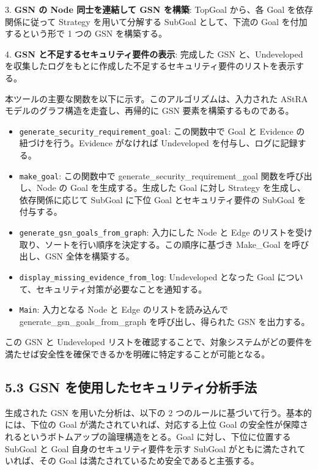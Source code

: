 \documentclass[paper]{ieicej} %
\begin{document}
3. \textbf{GSN の Node 同士を連結して GSN を構築}: TopGoal から、各 Goal を依存関係に従って Strategy を用いて分解する SubGoal として、下流の Goal を付加するという形で 1 つの GSN を構築する。

4. \textbf{GSN と不足するセキュリティ要件の表示}: 完成した GSN と、Undeveloped を収集したログをもとに作成した不足するセキュリティ要件のリストを表示する。

本ツールの主要な関数を以下に示す。このアルゴリズムは、入力された AStRA モデルのグラフ構造を走査し、再帰的に GSN 要素を構築するものである。

\begin{itemize}
    \item \texttt{generate\_security\_requirement\_goal}: この関数中で Goal と Evidence の紐づけを行う。Evidence がなければ Undeveloped を付与し、ログに記録する。
    \item \texttt{make\_goal}: この関数中で generate\_security\_requirement\_goal 関数を呼び出し、Node の Goal を生成する。生成した Goal に対し Strategy を生成し、依存関係に応じて SubGoal に下位 Goal とセキュリティ要件の SubGoal を付与する。
    \item \texttt{generate\_gsn\_goals\_from\_graph}: 入力にした Node と Edge のリストを受け取り、ソートを行い順序を決定する。この順序に基づき Make\_Goal を呼び出し、GSN 全体を構築する。
    \item \texttt{display\_missing\_evidence\_from\_log}: Undeveloped となった Goal について、セキュリティ対策が必要なことを通知する。
    \item \texttt{Main}: 入力となる Node と Edge のリストを読み込んで generate\_gsn\_goals\_from\_graph を呼び出し、得られた GSN を出力する。
\end{itemize}

この GSN と Undeveloped リストを確認することで、対象システムがどの要件を満たせば安全性を確保できるかを明確に特定することが可能となる。

\subsection{5.3 GSN を使用したセキュリティ分析手法}
生成された GSN を用いた分析は、以下の 2 つのルールに基づいて行う。基本的には、下位の Goal が満たされていれば、対応する上位 Goal の安全性が保障されるというボトムアップの論理構造をとる。Goal に対し、下位に位置する SubGoal と Goal 自身のセキュリティ要件を示す SubGoal がともに満たされていれば、その Goal は満たされているため安全であると主張する。
\end{document}
